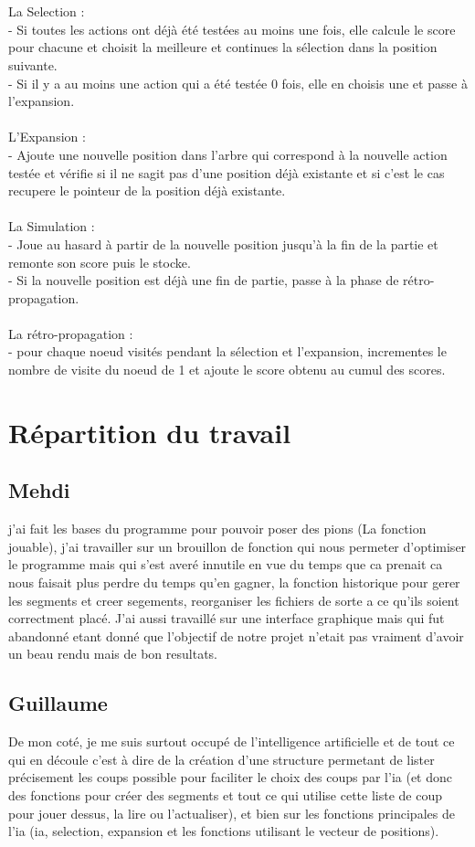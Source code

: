 \documentclass[11pt]{article}
\begin{document}
\\
\\La Selection :\\
- Si toutes les actions ont déjà été testées au moins une fois, elle calcule le score pour chacune et choisit la meilleure et continues la sélection dans la position suivante.\\- Si il y a au moins une action qui a été testée 0 fois, elle en choisis une et passe à l’expansion.\\
\\
L'Expansion :\\
- Ajoute une nouvelle position dans l’arbre qui correspond à la nouvelle action testée et vérifie si il ne sagit pas d'une position déjà existante et si c'est le cas recupere le pointeur de la position déjà existante.
\\
\\La Simulation :\\
- Joue au hasard à partir de la nouvelle position jusqu’à la fin de la partie et remonte son score puis le stocke.\\- Si la nouvelle position est déjà une fin de partie, passe à la phase de rétro-propagation.
\\
\\La rétro-propagation :\\
- pour chaque noeud visités pendant la sélection et l'expansion, incrementes le nombre de visite du noeud de 1 et ajoute le score obtenu au cumul des scores.
\section{Répartition du travail}
\subsection{Mehdi}
j'ai fait les bases du programme pour pouvoir poser des pions (La fonction jouable),
j'ai travailler sur un brouillon de fonction qui nous permeter d'optimiser le programme mais qui s'est averé innutile en vue du temps que ca prenait ca nous faisait plus perdre du temps qu'en gagner, la fonction historique pour gerer les segments et creer segements,
reorganiser les fichiers de sorte a ce qu'ils soient correctment placé.
J'ai aussi travaillé sur une interface graphique mais qui fut abandonné etant donné que l'objectif de notre projet n'etait pas vraiment d'avoir un beau rendu mais de bon resultats.
\subsection{Guillaume}
De mon coté, je me suis surtout occupé de l'intelligence artificielle et de tout ce qui en découle c'est à dire de la création d'une structure permetant de lister précisement les coups possible pour faciliter le choix des coups par l'ia (et donc des fonctions pour créer des segments et tout ce qui utilise cette liste de coup pour jouer dessus, la lire ou l'actualiser), et bien sur les fonctions principales de l'ia (ia, selection, expansion et les fonctions utilisant le vecteur de positions).
\end{document}
